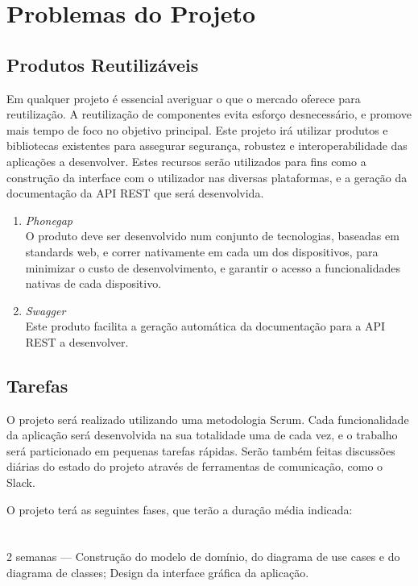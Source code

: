 \documentclass[12pt,a4paper]{article}
\begin{document}
\section{Problemas do Projeto}
  
  \subsection{Produtos Reutilizáveis}

  Em qualquer projeto é essencial averiguar o que o mercado oferece para reutilização. A reutilização de componentes evita esforço desnecessário, e promove mais tempo de foco no objetivo principal. Este projeto irá utilizar produtos e bibliotecas existentes para assegurar segurança, robustez e interoperabilidade das aplicações a desenvolver. Estes recursos serão utilizados para fins como a construção da interface com o utilizador nas diversas plataformas, e a geração da documentação da API REST que será desenvolvida.

  \begin{enumerate}
   \item \emph{Phonegap}\\
          O produto deve ser desenvolvido num conjunto de tecnologias, baseadas em standards web, e correr nativamente em cada um dos dispositivos, para minimizar o custo de desenvolvimento, e garantir o acesso a funcionalidades nativas de cada dispositivo.
   \item \emph{Swagger}\\
          Este produto facilita a geração automática da documentação para a API REST a desenvolver.
  \end{enumerate}

  \subsection{Tarefas}

    O projeto será realizado utilizando uma metodologia Scrum. Cada funcionalidade da aplicação será desenvolvida na sua totalidade uma de cada vez, e o trabalho será particionado em pequenas tarefas rápidas. Serão também feitas discussões diárias do estado do projeto através de ferramentas de comunicação, como o Slack.

    O projeto terá as seguintes fases, que terão a duração média indicada:

\paragraph{}
    \textbf{} \\
    2 semanas --- Construção do modelo de domínio, do diagrama de use cases e do diagrama de classes; Design da interface gráfica da aplicação.
\end{document}
